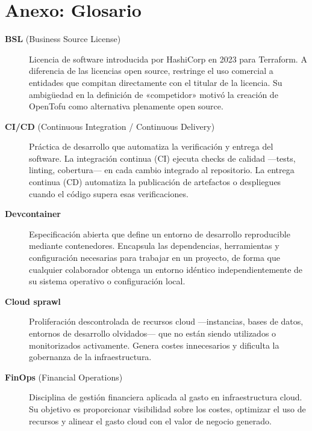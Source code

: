 \chapter*{Anexo: Glosario}


\begin{description}

    \item [\hypertarget{bsl}{\textbf{BSL}} (Business Source License)]
    Licencia de software introducida por HashiCorp en 2023 para Terraform. A
    diferencia de las licencias open source, restringe el uso comercial a entidades
    que compitan directamente con el titular de la licencia. Su ambigüedad en la
    definición de «competidor» motivó la creación de OpenTofu como alternativa
    plenamente open source.

    \item [\hypertarget{cicd}{\textbf{CI/CD}} (Continuous Integration / Continuous Delivery)]
    Práctica de desarrollo que automatiza la verificación y entrega del software.
    La integración continua (CI) ejecuta checks de calidad —tests, linting,
    cobertura— en cada cambio integrado al repositorio. La entrega continua (CD)
    automatiza la publicación de artefactos o despliegues cuando el código supera
    esas verificaciones.

    \item [\hypertarget{devcontainer}{\textbf{Devcontainer}}]
    Especificación abierta que define un entorno de desarrollo reproducible mediante
    contenedores. Encapsula las dependencias, herramientas y configuración necesarias
    para trabajar en un proyecto, de forma que cualquier colaborador obtenga un
    entorno idéntico independientemente de su sistema operativo o configuración local.

    \item [\hypertarget{cloud-sprawl}{\textbf{Cloud sprawl}}]
    Proliferación descontrolada de recursos cloud —instancias, bases de datos,
    entornos de desarrollo olvidados— que no están siendo utilizados o monitorizados
    activamente. Genera costes innecesarios y dificulta la gobernanza de la
    infraestructura.

    \item [\hypertarget{finops}{\textbf{FinOps}} (Financial Operations)]
    Disciplina de gestión financiera aplicada al gasto en infraestructura cloud.
    Su objetivo es proporcionar visibilidad sobre los costes, optimizar el uso de
    recursos y alinear el gasto cloud con el valor de negocio generado.


\end{description}
